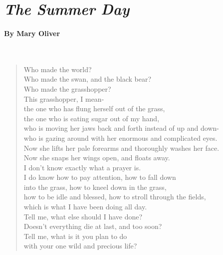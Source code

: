 \documentclass[12pt, openany, letterpaper]{memoir}
\begin{document}
\vspace{0.75em}
\hspace{12em}
\begin{minipage}{0.8\linewidth}
\section*{\emph{The Summer Day}}
\paragraph{By Mary Oliver}~
\begin{verse}
	Who made the world?\\
	Who made the swan, and the black bear?\\
	Who made the grasshopper?\\
	This grasshopper, I mean-\\
	the one who has flung herself out of the grass,\\
	the one who is eating sugar out of my hand,\\
	who is moving her jaws back and forth instead of up and down-\\
	who is gazing around with her enormous and complicated eyes.\\
	Now she lifts her pale forearms and thoroughly washes her face.\\
	Now she snaps her wings open, and floats away.\\
	I don't know exactly what a prayer is.\\
	I do know how to pay attention, how to fall down\\
	into the grass, how to kneel down in the grass,\\
	how to be idle and blessed, how to stroll through the fields,\\
	which is what I have been doing all day.\\
	Tell me, what else should I have done?\\
	Doesn't everything die at last, and too soon?\\
	Tell me, what is it you plan to do\\
	with your one wild and precious life?
\end{verse}
\end{minipage}
\end{document}

